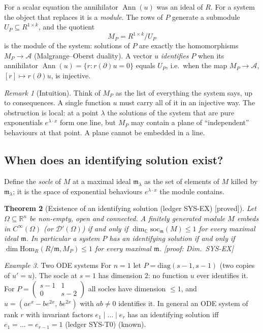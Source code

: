 \documentclass[11pt]{article}
\theoremstyle{plain}
\newtheorem{theorem}{Theorem}[section]
\theoremstyle{definition}
\theoremstyle{remark}
\newtheorem{remark}[theorem]{Remark}
\newtheorem{example}[theorem]{Example}
\newcommand{\R}{\mathbb{R}}
\newcommand{\C}{\mathbb{C}}
\DeclareMathOperator{\Ann}{Ann}             %
\newcommand{\badge}[2]{\textcolor{#1}{\textsf{\footnotesize[#2]}}}
\newcommand{\proved}[1][]{\badge{cC}{proved#1}}
\newcommand{\led}[1]{\textcolor{cG}{\textsf{\footnotesize(ledger #1)}}}
\newenvironment{intuition}{\begin{remark}[Intuition]}{\end{remark}}
\newcommand{\dimref}[1]{\textsf{\footnotesize[proof: Dim.~#1]}}
\begin{document}
For a scalar equation the annihilator $\Ann(u)$ was an ideal of $R$. For a system the object that replaces it is a \emph{module}. The rows of $P$ generate a submodule $U_P\subseteq R^{1\times k}$, and the quotient
\[
M_P=R^{1\times k}/U_P
\]
is the module of the system: solutions of $P$ are exactly the homomorphisms $M_P\to\mathcal A$ (Malgrange--Oberst duality). A vector $u$ \emph{identifies} $P$ when its annihilator $\Ann(u)=\{r:r(\partial)u=0\}$ equals $U_P$, i.e.\ when the map $M_P\to\mathcal A$, $[r]\mapsto r(\partial)u$, is injective.

\begin{intuition}
Think of $M_P$ as the list of everything the system says, up to consequences. A single function $u$ must carry all of it in an injective way. The obstruction is local: at a point $\lambda$ the solutions of the system that are pure exponentials $e^{\lambda\cdot x}$ form one line, but $M_P$ may contain a plane of ``independent'' behaviours at that point. A plane cannot be embedded in a line.
\end{intuition}

\subsection{When does an identifying solution exist?}

Define the \emph{socle} of $M$ at a maximal ideal $\mathfrak m_\lambda$ as the set of elements of $M$ killed by $\mathfrak m_\lambda$; it is the space of exponential behaviours $e^{\lambda\cdot x}$ the module contains.

\begin{theorem}[{Existence of an identifying solution \led{SYS-EX} \proved}]\label{thm:sysex}
Let $\Omega\subseteq\R^n$ be non-empty, open and connected. A finitely generated module $M$ embeds in $C^\infty(\Omega)$ (or $\mathcal D'(\Omega)$) if and only if $\dim_\C\mathrm{soc}_{\mathfrak m}(M)\le1$ for every maximal ideal $\mathfrak m$. In particular a system $P$ has an identifying solution if and only if $\dim\mathrm{Hom}_R(R/\mathfrak m,M_P)\le1$ for every maximal $\mathfrak m$.
\dimref{SYS-EX}
\end{theorem}

\begin{example}{Two ODE systems}
For $n=1$ let $P=\mathrm{diag}(s-1,s-1)$ (two copies of $u'=u$). The socle at $s=1$ has dimension $2$: no function $u$ ever identifies it. For $P=\begin{pmatrix}s-1&1\\0&s-2\end{pmatrix}$ all socles have dimension $\le1$, and $u=(ae^x-be^{2x},\,be^{2x})$ with $ab\ne0$ identifies it. In general an ODE system of rank $r$ with invariant factors $e_1\mid\dots\mid e_r$ has an identifying solution iff $e_1=\dots=e_{r-1}=1$ \led{SYS-T0} (known).
\end{example}
\end{document}
